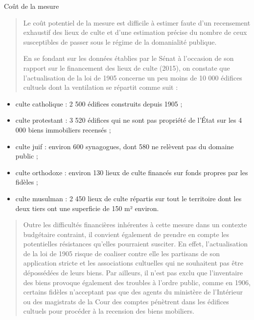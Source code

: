 Coût de la mesure

\begin{quote}
Le coût potentiel de la mesure est difficile à estimer faute d'un
recensement exhaustif des lieux de culte et d'une estimation précise du
nombre de ceux susceptibles de passer sous le régime de la domanialité
publique.



En se fondant sur les données établies par le Sénat à l'occasion de son
rapport sur le financement des lieux de culte (2015), on constate que
l'actualisation de la loi de 1905 concerne un peu moins de 10 000
édifices cultuels dont la ventilation se répartit comme suit :
\end{quote}

\begin{itemize}
\item
  culte catholique : 2 500 édifices construits depuis 1905 ;
\item
  culte protestant : 3 520 édifices qui ne sont pas propriété de l'État
  sur les 4 000 biens immobiliers recensés ;
\item
  culte juif : environ 600 synagogues, dont 580 ne relèvent pas du
  domaine public ;
\item
  culte orthodoxe : environ 130 lieux de culte financés sur fonds
  propres par les fidèles ;
\item
  culte musulman : 2 450 lieux de culte répartis sur tout le territoire
  dont les deux tiers ont une superficie de 150 m² environ.
\end{itemize}

\begin{quote}
Outre les difficultés financières inhérentes à cette mesure dans un
contexte budgétaire contraint, il convient également de prendre en
compte les potentielles résistances qu'elles pourraient susciter. En
effet, l'actualisation de la loi de 1905 risque de coaliser contre elle
les partisans de son application stricte et les associations cultuelles
qui ne souhaitent pas être dépossédées de leurs biens. Par ailleurs, il
n'est pas exclu que l'inventaire des biens provoque également des
troubles à l'ordre public, comme en 1906, certains fidèles n'acceptant
pas que des agents du ministère de l'Intérieur ou des magistrats de la
Cour des comptes pénètrent dans les édifices cultuels pour procéder à la
recension des biens mobiliers.
\end{quote}
